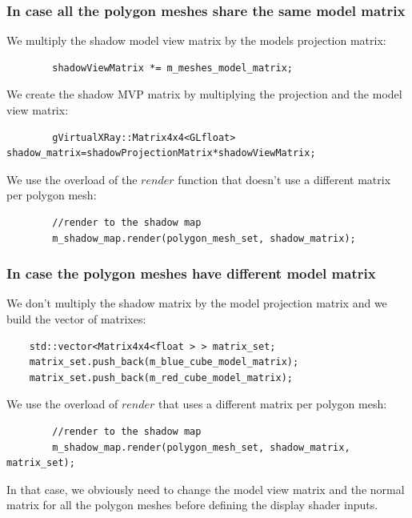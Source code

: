 \documentclass[12pt]{report}
\begin{document}
\subsubsection{In case all the polygon meshes share the same model matrix}

We multiply the shadow model view matrix by the models projection matrix:

\begin{lstlisting}
    	shadowViewMatrix *= m_meshes_model_matrix;
\end{lstlisting}

We create the shadow MVP matrix by multiplying the projection and the model view matrix:

\begin{lstlisting}
    	gVirtualXRay::Matrix4x4<GLfloat> shadow_matrix=shadowProjectionMatrix*shadowViewMatrix;
\end{lstlisting}

We use the overload of the $render$ function that doesn't use a different matrix per polygon mesh:

\begin{lstlisting}
    	//render to the shadow map
        m_shadow_map.render(polygon_mesh_set, shadow_matrix);
\end{lstlisting}

\subsubsection{In case the polygon meshes have different model matrix}

We don't multiply the shadow matrix by the model projection matrix and we build the vector of matrixes:

\begin{lstlisting}
	std::vector<Matrix4x4<float > > matrix_set;
	matrix_set.push_back(m_blue_cube_model_matrix);
	matrix_set.push_back(m_red_cube_model_matrix);
\end{lstlisting}

We use the overload of $render$ that uses a different matrix per polygon mesh:

\begin{lstlisting}
    	//render to the shadow map
        m_shadow_map.render(polygon_mesh_set, shadow_matrix, matrix_set);
\end{lstlisting}

In that case, we obviously need to change the model view matrix and the normal matrix for all the polygon meshes before defining the display shader inputs.
\end{document}
